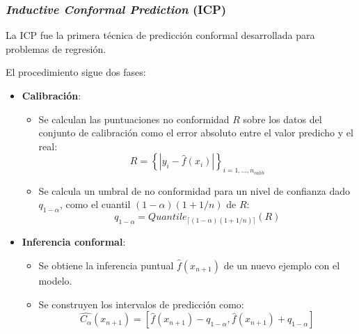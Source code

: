 
\subsubsection{\textit{Inductive Conformal Prediction} (ICP)}

La ICP \cite{papadopoulos2002} fue la primera técnica de predicción conformal desarrollada para problemas de 
regresión. 

El procedimiento sigue dos fases:

\begin{itemize}

    \item \textbf{Calibración}:
    
    \begin{itemize}
        \item Se calculan las puntuaciones no conformidad $R$ sobre los datos del conjunto de calibración como el 
        error absoluto entre el valor predicho y el real:
        $$
        R = \left\{ | y_i - \hat{f}(x_i) | \right\}_{i=1,...,n_{calib}}
        $$

        \item Se calcula un umbral de no conformidad para un nivel de confianza dado $q_{1-\alpha}$, como el 
        cuantil $(1-\alpha)(1+1/n)$ de $R$:
        $$
        q_{1-\alpha} = Quantile_{ \lceil  (1-\alpha) (1 + 1/n)  \rceil } ( R )
        $$

    \end{itemize}
    
    \item \textbf{Inferencia conformal}:
    
    \begin{itemize}

        \item Se obtiene la inferencia puntual $\hat{f}(x_{n+1})$ de un nuevo ejemplo con el modelo.  
        
        \item Se construyen los intervalos de predicción como:
        $$
        \hat{C_\alpha}(x_{n+1}) = \left[ \hat{f}(x_{n+1}) - q_{1-\alpha}, \hat{f}(x_{n+1}) + q_{1-\alpha}\right]
        $$

    \end{itemize}

\end{itemize}

